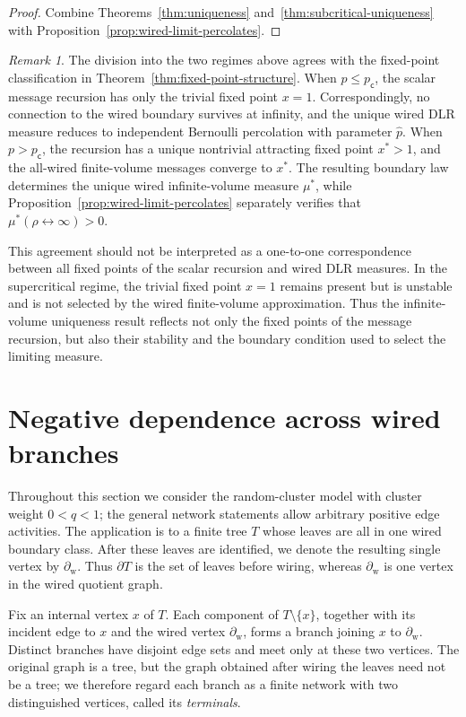 \documentclass[11pt]{amsart}
\theoremstyle{plain}
\theoremstyle{definition}
\theoremstyle{remark}
\newtheorem{remark}[theorem]{Remark}
\newcommand{\pc}{p_{\mathsf{c}}}
\begin{document}
\begin{proof}
Combine Theorems~\ref{thm:uniqueness} and~\ref{thm:subcritical-uniqueness} with Proposition~\ref{prop:wired-limit-percolates}.
\end{proof}

\begin{remark}
The division into the two regimes above agrees with the fixed-point classification in Theorem~\ref{thm:fixed-point-structure}. When $p\le\pc$, the scalar message recursion has only the trivial fixed point $x=1$. Correspondingly, no connection to the wired boundary survives at infinity, and the unique wired DLR measure reduces to independent Bernoulli percolation with parameter $\widehat p$. When $p>\pc$, the recursion has a unique nontrivial attracting fixed point $x^*>1$, and the all-wired finite-volume messages converge to $x^*$. The resulting boundary law determines the unique wired infinite-volume measure $\mu^*$, while Proposition~\ref{prop:wired-limit-percolates} separately verifies that $\mu^*(\rho\leftrightarrow\infty)>0$.

This agreement should not be interpreted as a one-to-one correspondence between all fixed points of the scalar recursion and wired DLR measures. In the supercritical regime, the trivial fixed point $x=1$ remains present but is unstable and is not selected by the wired finite-volume approximation. Thus the infinite-volume uniqueness result reflects not only the fixed points of the message recursion, but also their stability and the boundary condition used to select the limiting measure.
\end{remark}


\section{Negative dependence across wired branches}
\label{sec:negative-dependence}

Throughout this section we consider the random-cluster model with cluster weight $0<q<1$; the general network statements allow arbitrary positive edge activities. The application is to a finite tree $T$ whose leaves are all in one wired boundary class. After these leaves are identified, we denote the resulting single vertex by $\partial_{\mathrm w}$. Thus $\partial T$ is the set of leaves before wiring, whereas $\partial_{\mathrm w}$ is one vertex in the wired quotient graph.

Fix an internal vertex $x$ of $T$. Each component of $T\setminus\{x\}$, together with its incident edge to $x$ and the wired vertex $\partial_{\mathrm w}$, forms a branch joining $x$ to $\partial_{\mathrm w}$. Distinct branches have disjoint edge sets and meet only at these two vertices. The original graph is a tree, but the graph obtained after wiring the leaves need not be a tree; we therefore regard each branch as a finite network with two distinguished vertices, called its \emph{terminals}.
\end{document}
